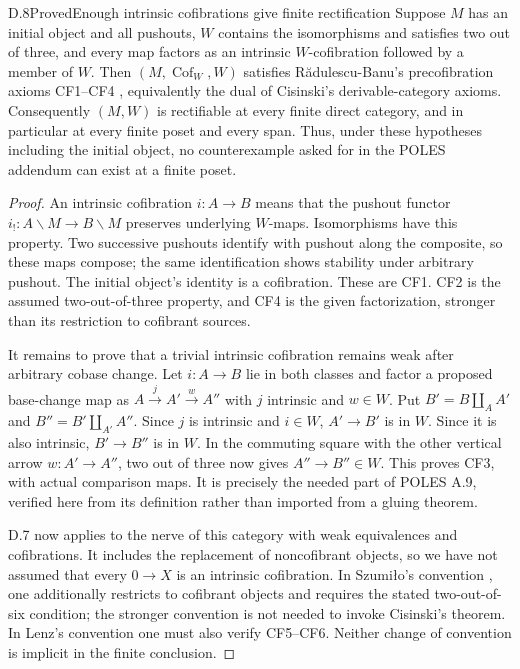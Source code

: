 \begin{result}{D.8}{Proved}{Enough intrinsic cofibrations give finite rectification}
Suppose $M$ has an initial object and all pushouts, $W$ contains the
isomorphisms and satisfies two out of three, and every map factors
as an intrinsic $W$-cofibration followed by a member of $W$.
Then $(M,\operatorname{Cof}_W,W)$ satisfies R\u adulescu-Banu's
precofibration axioms CF1--CF4 \citep[Definition 1.1.1]{DRadulescu2009},
equivalently the dual of Cisinski's
derivable-category axioms. Consequently $(M,W)$ is rectifiable at
every finite direct category, and in particular at every finite
poset and every span. Thus, under these hypotheses including the
initial object, no counterexample asked for in the POLES addendum
can exist at a finite poset.
\end{result}
\begin{proof}
An intrinsic cofibration $i:A\to B$ means that the pushout functor
$i_!:A\backslash M\to B\backslash M$ preserves underlying
$W$-maps. Isomorphisms have this property. Two successive pushouts
identify with pushout along the composite, so these maps compose;
the same identification shows stability under arbitrary pushout.
The initial object's identity is a cofibration. These are CF1.
CF2 is the assumed two-out-of-three property, and CF4 is the given
factorization, stronger than its restriction to cofibrant sources.

It remains to prove that a trivial intrinsic cofibration remains
weak after arbitrary cobase change. Let $i:A\to B$ lie in both
classes and factor a proposed base-change map as
$A\xrightarrow{j}A'\xrightarrow{w}A''$ with $j$ intrinsic and
$w\in W$. Put $B'=B\amalg_A A'$ and
$B''=B'\amalg_{A'}A''$. Since $j$ is intrinsic and $i\in W$,
$A'\to B'$ is in $W$. Since it is also intrinsic,
$B'\to B''$ is in $W$. In the commuting square with the other
vertical arrow $w:A'\to A''$, two out of three now gives
$A''\to B''\in W$. This proves CF3, with actual comparison maps.
It is precisely the needed part of POLES A.9, verified here from
its definition rather than imported from a gluing theorem.

D.7 now applies to the nerve of this category with weak
equivalences and cofibrations. It includes the replacement of
noncofibrant objects, so we have not assumed that every
$0\to X$ is an intrinsic cofibration. In Szumi\l o's convention \citep[Section 1.1, axioms C0--C5]{DSzumilo2014},
one additionally restricts to cofibrant objects and requires the
stated two-out-of-six condition; the stronger convention is not
needed to invoke Cisinski's theorem. In Lenz's convention one
must also verify CF5--CF6. Neither change of convention is implicit
in the finite conclusion.
\end{proof}

